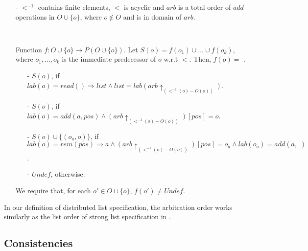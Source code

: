 \begin{itemize}
\setlength{\itemsep}{0.5pt}
\item[-] $<^{-1}$ contains finite elements, $<$ is acyclic and $arb$ is a total order of $add$ operations in $O \cup \{ o \}$, where $o \notin O$ and is in domain of $arb$. 

\item[-] {\color {red}Function $f: O \cup \{ o \} \rightarrow P(O \cup \{ o \})$. Let $S(o) = f(o_1) \cup \ldots \cup f(o_k)$, where $o_1,\ldots,o_k$ is the immediate predecessor of $o$ w.r.t $<$. Then, $f(o) = $ .

    \begin{itemize}
    \setlength{\itemsep}{0.5pt}
    \item[-] $S(o)$, if $lab(o)=read()\Rightarrow list \wedge list = lab( arb \uparrow_{ (<^{-1}(o)-O(o)) } )$. 
    
    \item[-] $S(o)$, if $lab(o)=add(a,pos) \wedge ( arb \uparrow_{ (<^{-1}(o)-O(o)) } )[pos]=o$. 
    
    \item[-] $S(o) \cup \{ (o_a,o) \}$, if $lab(o)=rem(pos)\Rightarrow a \wedge ( arb \uparrow_{ (<^{-1}(o)-O(o)) } )[pos]=o_a \wedge lab(o_a)=add(a,\_)$. 
    
    \item[-] $\mathit{Undef}$, otherwise. 
    \end{itemize}

    We require that, for each $o' \in O \cup \{ o \}$, $f(o') \neq \mathit{Undef}$.} 
\end{itemize}


In our definition of distributed list specification, the arbitration order works similarly as the list order of strong list specification in \cite{Attiya:2016}.





\subsection{Consistencies}
\label{subsec:consistencies}


